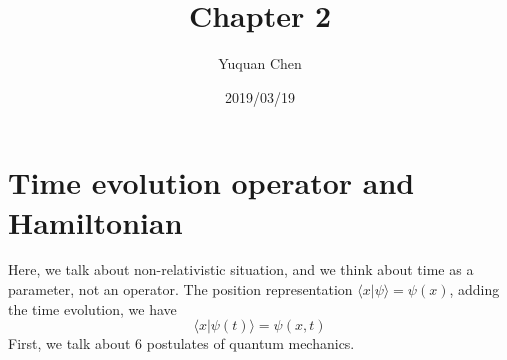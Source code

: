 \documentclass[UTF8,12pt]{article} %
\begin{document}
\title{Chapter 2}
\author{Yuquan Chen}
\date{2019/03/19} %
\maketitle

\section{Time evolution operator and Hamiltonian}

Here, we talk about non-relativistic situation, and we think about time as a parameter, not an operator. The position representation $\langle x|\psi\rangle = \psi(x)$, adding the time evolution, we have $$\langle x|\psi(t)\rangle = \psi(x,t)$$
First, we talk about 6 postulates of quantum mechanics.\\
\end{document}

